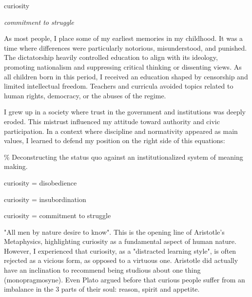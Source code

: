 


\begin{center}
\vspace*{\fill}
\Huge curiosity

\vspace{2cm}

\begin{flushright}
\large
\textit{commitment to struggle}
\end{flushright}

\vspace*{\fill}
\end{center}

\normalsize

As most people, I place some of my earliest memories in my childhood. It was a time where differences were particularly notorious, misunderstood, and punished. The dictatorship heavily controlled education to align with its ideology, promoting nationalism and suppressing critical thinking or dissenting views. As all children born in this period, I received an education shaped by censorship and limited intellectual freedom. Teachers and curricula avoided topics related to human rights, democracy, or the abuses of the regime. 

I grew up in a society where trust in the government and institutions was deeply eroded. This mistrust influenced my attitude toward authority and civic participation. In a context where discipline and normativity appeared as main values, I learned to defend my position on the right side of this equations: 

{\scriptsize \textcolor{comment}{\%  Deconstructing the status quo against an institutionalized system of meaning making.}}

curiosity = disobedience

curiosity = insubordination

curiosity = commitment to struggle 

"All men by nature desire to know". This is the opening line of Aristotle's Metaphysics, highlighting curiosity as a fundamental aspect of human nature.  However, I experienced that curiosity, as a "distracted learning style", is often rejected as a vicious form, as opposed to a virtuous one. Aristotle did actually have an inclination to recommend being studious about one thing (monopragmosyne). Even Plato argued before that curious people suffer from an imbalance in the 3 parts of their soul: reason, spirit and appetite. \citep{perry2020}

